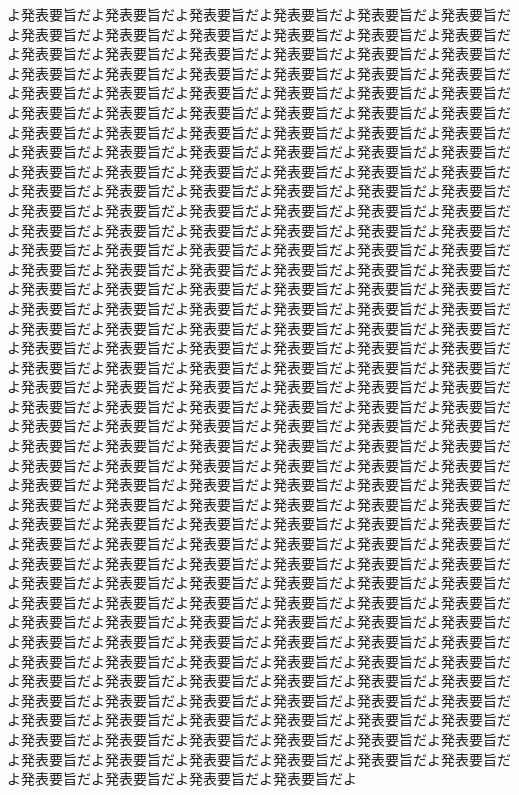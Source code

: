 \documentclass[uplatex]{jsarticle}
\begin{document}
\begin{AbstractBody}
よ発表要旨だよ発表要旨だよ発表要旨だよ発表要旨だよ発表要旨だよ発表要旨だよ発表要旨だよ発表要旨だよ発表要旨だよ発表要旨だよ発表要旨だよ発表要旨だよ発表要旨だよ発表要旨だよ発表要旨だよ発表要旨だよ発表要旨だよ発表要旨だよ発表要旨だよ発表要旨だよ発表要旨だよ発表要旨だよ発表要旨だよ発表要旨だよ発表要旨だよ発表要旨だよ発表要旨だよ発表要旨だよ発表要旨だよ発表要旨だよ発表要旨だよ発表要旨だよ発表要旨だよ発表要旨だよ発表要旨だよ発表要旨だよ発表要旨だよ発表要旨だよ発表要旨だよ発表要旨だよ発表要旨だよ発表要旨だよ発表要旨だよ発表要旨だよ発表要旨だよ発表要旨だよ発表要旨だよ発表要旨だよ発表要旨だよ発表要旨だよ発表要旨だよ発表要旨だよ発表要旨だよ発表要旨だよ発表要旨だよ発表要旨だよ発表要旨だよ発表要旨だよ発表要旨だよ発表要旨だよ発表要旨だよ発表要旨だよ発表要旨だよ発表要旨だよ発表要旨だよ発表要旨だよ発表要旨だよ発表要旨だよ発表要旨だよ発表要旨だよ発表要旨だよ発表要旨だよ発表要旨だよ発表要旨だよ発表要旨だよ発表要旨だよ発表要旨だよ発表要旨だよ発表要旨だよ発表要旨だよ発表要旨だよ発表要旨だよ発表要旨だよ発表要旨だよ発表要旨だよ発表要旨だよ発表要旨だよ発表要旨だよ発表要旨だよ発表要旨だよ発表要旨だよ発表要旨だよ発表要旨だよ発表要旨だよ発表要旨だよ発表要旨だよ発表要旨だよ発表要旨だよ発表要旨だよ発表要旨だよ発表要旨だよ発表要旨だよ発表要旨だよ発表要旨だよ発表要旨だよ発表要旨だよ発表要旨だよ発表要旨だよ発表要旨だよ発表要旨だよ発表要旨だよ発表要旨だよ発表要旨だよ発表要旨だよ発表要旨だよ発表要旨だよ発表要旨だよ発表要旨だよ発表要旨だよ発表要旨だよ発表要旨だよ発表要旨だよ発表要旨だよ発表要旨だよ発表要旨だよ発表要旨だよ発表要旨だよ発表要旨だよ発表要旨だよ発表要旨だよ発表要旨だよ発表要旨だよ発表要旨だよ発表要旨だよ発表要旨だよ発表要旨だよ発表要旨だよ発表要旨だよ発表要旨だよ発表要旨だよ発表要旨だよ発表要旨だよ発表要旨だよ発表要旨だよ発表要旨だよ発表要旨だよ発表要旨だよ発表要旨だよ発表要旨だよ発表要旨だよ発表要旨だよ発表要旨だよ発表要旨だよ発表要旨だよ発表要旨だよ発表要旨だよ発表要旨だよ発表要旨だよ発表要旨だよ発表要旨だよ発表要旨だよ発表要旨だよ発表要旨だよ発表要旨だよ発表要旨だよ発表要旨だよ発表要旨だよ発表要旨だよ発表要旨だよ発表要旨だよ発表要旨だよ発表要旨だよ発表要旨だよ発表要旨だよ発表要旨だよ発表要旨だよ発表要旨だよ発表要旨だよ発表要旨だよ発表要旨だよ発表要旨だよ発表要旨だよ発表要旨だよ発表要旨だよ発表要旨だよ発表要旨だよ発表要旨だよ発表要旨だよ発表要旨だよ発表要旨だよ発表要旨だよ発表要旨だよ発表要旨だよ発表要旨だよ発表要旨だよ発表要旨だよ発表要旨だよ発表要旨だよ発表要旨だよ発表要旨だよ発表要旨だよ発表要旨だよ発表要旨だよ発表要旨だよ発表要旨だよ発表要旨だよ発表要旨だよ発表要旨だよ発表要旨だよ発表要旨だよ発表要旨だよ発表要旨だよ発表要旨だよ発表要旨だよ発表要旨だよ発表要旨だよ発表要旨だよ発表要旨だよ発表要旨だよ発表要旨だよ発表要旨だよ発表要旨だよ発表要旨だよ発表要旨だよ発表要旨だよ発表要旨だよ発表要旨だよ発表要旨だよ発表要旨だよ発表要旨だよ発表要旨だよ発表要旨だよ発表要旨だよ発表要旨だよ発表要旨だよ発表要旨だよ発表要旨だよ発表要旨だよ

\end{AbstractBody}
\end{document}
